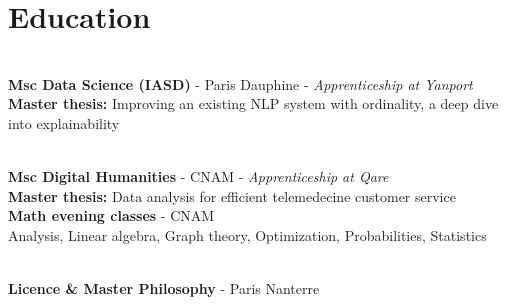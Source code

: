 \documentclass[a4paper,10pt]{article}
\begin{document}
\begin{adjustbox}{valign=t}
\begin{minipage}{0.6\textwidth}
        \section*{Education}
        \vspace{-.3cm}
        \begin{description}
            \raggedright
            \item [\normalfont \textcolor{ColorOne}{2021 -- 2022}]~\\
                \textbf{Msc Data Science (IASD)} - Paris Dauphine - \textit{Apprenticeship at Yanport}\\
                \quad \textbf{Master thesis:} Improving an existing NLP system with ordinality, a deep dive into explainability
            \item [\normalfont \textcolor{ColorOne}{2019 -- 2021}]~\\
                \textbf{Msc Digital Humanities} - CNAM - \textit{Apprenticeship at Qare}\\
                \quad \textbf{Master thesis:} Data analysis for efficient telemedecine customer service\\
                \vspace{.1cm}
                \textbf{Math evening classes} - CNAM\\
                \small \quad Analysis, Linear algebra, Graph theory, Optimization, Probabilities, Statistics \normalsize
            \item [\normalfont \textcolor{ColorOne}{2012-2017}]~\\
                \textbf{Licence \& Master Philosophy} -  Paris Nanterre\\
        \end{description}
    \end{minipage}
\end{adjustbox}
\end{document}
